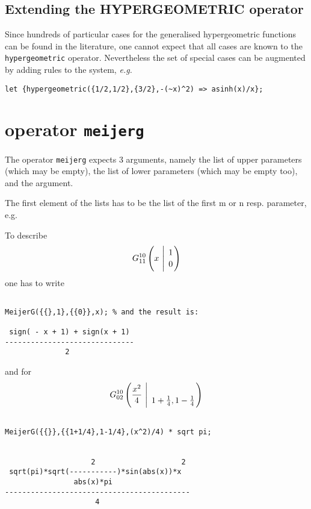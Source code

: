 \subsection{Extending the HYPERGEOMETRIC operator}

Since hundreds of particular cases for the generalised hypergeometric
functions can be found in the literature, one cannot expect that all
cases are known to the \texttt{hypergeometric} operator.
Nevertheless the set of special cases can be augmented by adding
rules to the \REDUCE{} system, {\em e.g.}
\begin{verbatim}
let {hypergeometric({1/2,1/2},{3/2},-(~x)^2) => asinh(x)/x};
\end{verbatim}


\section{\REDUCE{} operator {\tt meijerg}}
\hypertarget{operator:MEIJERG}{}

The operator \texttt{meijerg} expects 3 arguments, namely the 
list of upper parameters (which may be empty), the list of lower
parameters (which may be empty too), and the argument.

The first element of the lists has to be the list of the
first m or n resp. parameter, e.g.

To describe 
\begin{displaymath}
G_{1 1}^{1 0} \left( x \  \Bigg\vert \  {1 \atop 0} \right)
\end{displaymath}
one has to write 
\begin{verbatim}

MeijerG({{},1},{{0}},x); % and the result is:

 sign( - x + 1) + sign(x + 1)
------------------------------
              2

\end{verbatim}
and for
\begin{displaymath}
G_{0 2}^{1 0} \left( \frac{x^2}{4} \  \Bigg\vert \ {\atop  {1+ \frac{1}{4} },
{1-\frac{1}{4}}} \right)
\end{displaymath}
\begin{verbatim}

MeijerG({{}},{{1+1/4},1-1/4},(x^2)/4) * sqrt pi;


                    2                    2
 sqrt(pi)*sqrt(-----------)*sin(abs(x))*x
                abs(x)*pi
-------------------------------------------
                     4


\end{verbatim}


